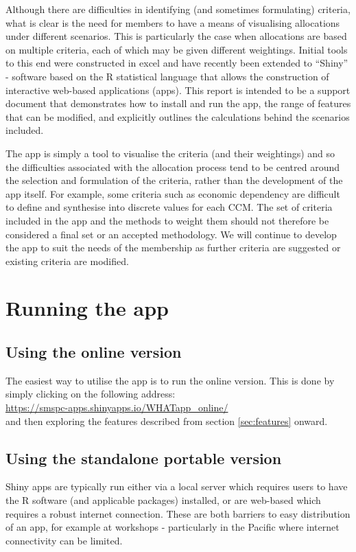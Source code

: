 \documentclass[11pt]{article}
\begin{document}
Although there are difficulties in identifying (and sometimes formulating) criteria, what is clear is the need for members to have a means of visualising allocations under different scenarios. This is particularly the case when allocations are based on multiple criteria, each of which may be given different weightings. Initial tools to this end were constructed in excel and have recently been extended to ``Shiny'' - software based on the R statistical language that allows the construction of interactive web-based applications (apps). This report is intended to be a support document that demonstrates how to install and run the app, the range of features that can be modified, and explicitly outlines the calculations behind the scenarios included.

The app is simply a tool to visualise the criteria (and their weightings) and so the difficulties associated with the allocation process tend to be centred around the selection and formulation of the criteria, rather than the development of the app itself. For example, some criteria such as economic dependency are difficult to define and synthesise into discrete values for each CCM. The set of criteria included in the app and the methods to weight them should not therefore be considered a final set or an accepted methodology. We will continue to develop the app to suit the needs of the membership as further criteria are suggested or existing criteria are modified.

\section{Running the app}
\subsection{Using the online version}
The easiest way to utilise the app is to run the online version. This is done by simply clicking on the following address: \vspace{5mm} \\
\href{https://smspc-apps.shinyapps.io/WHATapp_online/}{\qquad \qquad \qquad https://smspc-apps.shinyapps.io/WHATapp\_online/} \vspace{5mm} \\
and then exploring the features described from section \ref{sec:features} onward.

\subsection{Using the standalone portable version}
Shiny apps are typically run either via a local server which requires users to have the R software (and applicable packages) installed, or are web-based which requires a robust internet connection. These are both barriers to easy distribution of an app, for example at workshops - particularly in the Pacific where internet connectivity can be limited.
\end{document}
